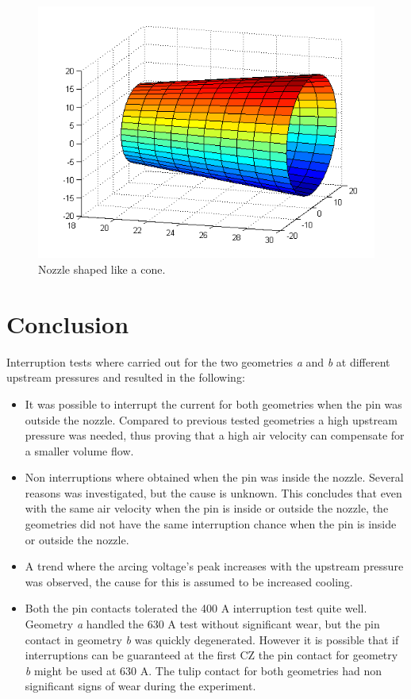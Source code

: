 \documentclass[10pt,a4paper,twoside]{article}
\begin{document}
\begin{figure}[H]
\centering
\includegraphics[scale=0.6]{Bilder/Discussion/cone_D16.png}
\caption{Nozzle shaped like a cone.} \label{fig:cone_D16}
\end{figure}

\cleardoublepage

\section{Conclusion}
Interruption tests where carried out for the two geometries \textit{a} and \textit{b} at different upstream pressures and resulted in the following:
\begin{itemize}
\item	It was possible to interrupt the current for both geometries when the pin was outside the nozzle. Compared to previous tested geometries a high upstream pressure was needed, thus proving that a high air velocity can compensate for a smaller volume flow.
\item	Non interruptions where obtained when the pin was inside the nozzle. Several reasons was investigated, but the cause is unknown. This concludes that even with the same air velocity when the pin is inside or outside the  nozzle, the geometries did not have the same interruption chance when the pin is inside or outside the nozzle.
\item	A trend where the arcing voltage's peak increases with the upstream pressure was observed, the cause for this is assumed to be increased cooling.

\item Both the pin contacts tolerated the 400 A interruption test quite well. Geometry \textit{a} handled the 630 A test without significant wear, but the pin contact in geometry \textit{b} was quickly degenerated. However it is possible that if interruptions can be guaranteed at the first CZ the pin contact for geometry \textit{b} might be used at 630 A. The tulip contact for both geometries had non significant signs of wear during the experiment.
\end{itemize}
\end{document}
